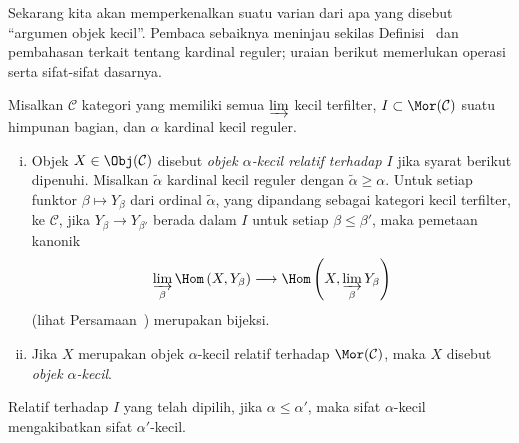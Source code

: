 Sekarang kita akan memperkenalkan suatu varian dari apa yang disebut
``argumen objek kecil''. Pembaca sebaiknya meninjau sekilas
Definisi~ dan pembahasan terkait tentang kardinal
reguler; uraian berikut memerlukan operasi serta sifat-sifat dasarnya.

\begin{definisi}\label{def:I-small}
	Misalkan $\mathcal{C}$ kategori yang memiliki semua $\varinjlim$ kecil
	terfilter, $I\subset\Mor(\mathcal{C})$ suatu himpunan bagian, dan $\alpha$
	kardinal kecil reguler.
	\begin{enumerate}[(i)]
		\item Objek $X\in\Obj(\mathcal{C})$ disebut \emph{objek $\alpha$-kecil
		relatif terhadap $I$} jika syarat berikut dipenuhi. Misalkan
		$\widetilde{\alpha}$ kardinal kecil reguler dengan
		$\widetilde{\alpha}\geq\alpha$. Untuk setiap funktor
		$\beta\mapsto Y_\beta$ dari ordinal $\widetilde{\alpha}$, yang dipandang
		sebagai kategori kecil terfilter, ke $\mathcal{C}$, jika
		$Y_\beta\to Y_{\beta'}$ berada dalam $I$ untuk setiap
		$\beta\leq\beta'$, maka pemetaan kanonik
		\[\varinjlim_\beta\Hom\left(X,Y_\beta\right)
		\longrightarrow\Hom\left(X,\varinjlim_\beta Y_\beta\right)\]
		(lihat Persamaan~) merupakan bijeksi.

		\item Jika $X$ merupakan objek $\alpha$-kecil relatif terhadap
		$\Mor(\mathcal{C})$, maka $X$ disebut \emph{objek $\alpha$-kecil}.
	\end{enumerate}
\end{definisi}

Relatif terhadap $I$ yang telah dipilih, jika $\alpha\leq\alpha'$, maka sifat
$\alpha$-kecil mengakibatkan sifat $\alpha'$-kecil.

